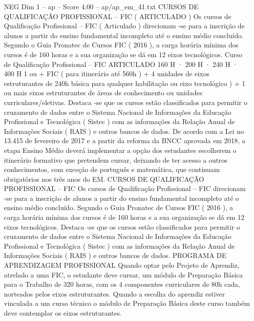 \begin{textsample}{NEG Dim 1 – ap – Score 4.00 – ap/ap\_em\_41.txt}  \label{ex:f1_neg_130}
CURSOS DE QUALIFICAÇÃO PROFISSIONAL – FIC ( ARTICULADO ) Os cursos de Qualificação Profissional – FIC ( Articulado ) direcionam -se para a inscrição de alunos a partir do ensino fundamental incompleto até o ensino médio concluído.
Segundo o Guia Pronatec de Cursos FIC ( 2016 ), a carga horária mínima dos cursos é de 160 horas e a sua organização se dá em 12 eixos tecnológicos.
Curso de Qualificação Profissional – FIC ARTICULADO 160 H · 200 H · 240 H · 400 H 1 ou + FIC ( para itinerário até 560h ) + 4 unidades de eixos estruturantes de 240h básica para qualquer habilitação ou eixo tecnológico ) + 1 ou mais eixos estruturantes de áreas de conhecimento ou unidades curriculares/eletivas.
Destaca -se que os cursos estão classificados para permitir o cruzamento de dados entre o Sistema Nacional de Informações da Educação Profissional e Tecnológica ( Sistec ) com as informações da Relação Anual de Informações Sociais ( RAIS ) e outros bancos de dados.
De acordo com a Lei no 13.415 de fevereiro de 2017 e a partir da reforma da BNCC aprovada em 2018, a etapa Ensino Médio deverá implementar a opção dos estudantes escolherem o itinerário formativo que pretendem cursar, deixando de ter acesso a outros conhecimentos, com exceção de português e matemática, que continuam obrigatórios nos três anos do EM.
CURSOS DE QUALIFICAÇÃO PROFISSIONAL – FIC Os cursos de Qualificação Profissional – FIC direcionam -se para a inscrição de alunos a partir do ensino fundamental incompleto até o ensino médio concluído.
Segundo o Guia Pronatec de Cursos FIC ( 2016 ), a carga horária mínima dos cursos é de 160 horas e a sua organização se dá em 12 eixos tecnológicos.
Destaca -se que os cursos estão classificados para permitir o cruzamento de dados entre o Sistema Nacional de Informações da Educação Profissional e Tecnológica ( Sistec ) com as informações da Relação Anual de Informações Sociais ( RAIS ) e outros bancos de dados.
PROGRAMA DE APRENDIZAGEM PROFISSIONAL Quando optar pelo Projeto de Aprendiz, atrelado a uma FIC, o estudante deve cursar, um módulo de Preparação Básica para o Trabalho de 320 horas, com os 4 componentes curriculares de 80h cada, norteados pelos eixos estruturantes.
Quando a escolha do aprendiz estiver vinculada a um curso técnico o módulo de Preparação Básica deste curso também deve contemplar os eixos estruturantes.

\end{textsample}
